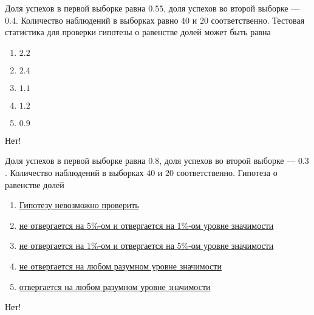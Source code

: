 \documentclass[t]{beamer}
\begin{document}
 \begin{frame} \label{9-No} 
\begin{block}{9} 

  Доля успехов в первой выборке равна $0.55$, доля успехов во второй выборке — $0.4$. Количество наблюдений в выборках равно $40$ и $20$ соответственно. Тестовая статистика для проверки гипотезы о равенстве долей может быть равна
  


 \end{block} 
\begin{enumerate} 
\item[] \hyperlink{9-No}{\beamergotobutton{} $2.2$}
\item[] \hyperlink{9-No}{\beamergotobutton{} $2.4$}
\item[] \hyperlink{9-Yes}{\beamergotobutton{} $1.1$}
\item[] \hyperlink{9-No}{\beamergotobutton{} $1.2$}
\item[] \hyperlink{9-No}{\beamergotobutton{} $0.9$}
\end{enumerate} 

 \alert{Нет!} 
\end{frame} 


 \begin{frame} \label{10-No} 
\begin{block}{10} 

  Доля успехов в первой выборке равна $0.8$, доля успехов во второй выборке — $0.3$. Количество наблюдений в выборках $40$ и $20$ соответственно. Гипотеза о равенстве долей
  


 \end{block} 
\begin{enumerate} 
\item[] \hyperlink{10-No}{\beamergotobutton{} Гипотезу невозможно проверить}
\item[] \hyperlink{10-No}{\beamergotobutton{} не отвергается на 5\%-ом и отвергается на 1\%-ом уровне значимости}
\item[] \hyperlink{10-No}{\beamergotobutton{} не отвергается на 1\%-ом и отвергается на 5\%-ом уровне значимости}
\item[] \hyperlink{10-No}{\beamergotobutton{} не отвергается на любом разумном уровне значимости}
\item[] \hyperlink{10-Yes}{\beamergotobutton{} отвергается на любом разумном уровне значимости}
\end{enumerate} 

 \alert{Нет!} 
\end{frame} 
\end{document}
